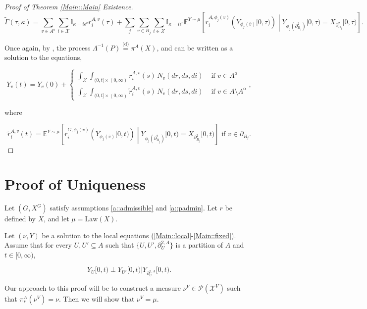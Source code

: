 \documentclass[12pt]{article}
\newcommand{\mb}{\mathbb}
\newcommand{\mc}{\mathcal}
\newcommand{\ov}{\overline}
\newcommand{\te}{\text}
\newcommand{\ep}{\epsilon}
\newcommand{\ind}{\hspace{24pt}}
\newcommand{\exmu}[2]{\mb{E}^{#1}\left[#2\right]}	%
\newcommand{\deq}{\overset{\text{(d)}}{=}}			%
\newcommand{\pmsr}{\mc{P}}							%
\newcommand{\sta}{\mc{X}}							%
\newcommand{\neigh}[1]{\partial_{#1}}				%
\newcommand{\dneigh}[1]{\partial^2_{#1}}			%
\newcommand{\dgneigh}[2]{\partial^{2,#1}_{#2}}		%
\newcommand{\cl}[1]{\ov{#1}}						%
\newcommand{\Xf}{X}									%
\newcommand{\poiss}{N}								%
\newcommand{\rate}{r}								%
\newcommand{\m}{\mu}								%
\newcommand{\proj}{\pi}								%
\newcommand{\poissv}[1]{_{#1}}						%
\newcommand{\vind}[1]{_{#1}}						%
\newcommand{\tme}[1]{(#1)}							%
\newcommand{\tmi}[1]{#1}							%
\newcommand{\gind}[1]{^{#1}}						%
\newcommand{\vpara}[1]{^{#1}}						%
\newcommand{\stpara}[1]{_{#1}}						%
\newcommand{\gvpara}[2]{^{#1,#2}}					%
\newcommand{\psf}{_*}								%
\newcommand{\Xg}{Y}									%
\newcommand{\brate}{\alt{\rate}}					%
\newcommand{\inte}[1]{{#1}^\mathrm{o}}				%
\newcommand{\alt}[1]{\tilde{#1}}					%
\newcommand{\pmap}{\Lambda}							%
\newcommand{\rt}{\tau}								%
\renewcommand{\mark}{\kappa}						%
\newcommand{\ratee}{\Gamma}							%
\newcommand{\rp}{P}									%
\newcommand{\mm}{\nu}								%
\newcommand{\law}{\te{Law}}							%
\newcommand{\ev}[1]{\ep^{#1}}						%
\begin{document}
\begin{proof}[Proof of Theorem \ref{Main::Main} Existence]
\[\alt{\ratee}(\rt,\mark) = \sum_{v \in \inte{A}}\sum_{i\in \sta} \mb{I}_{\mark = i\ev{v}}\rate\gvpara{A}{v}\stpara{i}\tme{\rt} + \sum_j\sum_{v \in B_j}\sum_{i \in \sta} \mb{I}_{\mark = i\ev{v}}\exmu{\Xg\sim \m}{\rate\gvpara{A}{\phi_j(v)}\stpara{i}\left(\Xg\vind{\phi_j(\cl{v})}\tmi{[0,\rt)}\right)\middle|\Xg\vind{\phi_j(\dneigh{B_j})}\tmi{[0,\rt)} = \Xf\vind{\dneigh{B_j}}\tmi{[0,\rt)}}.\]

Once again, by \cite[Exercise 14.7.1]{DalVer08}, the process \(\pmap^{-1}(\rp) \deq \proj\vpara{A}(\Xf)\), and can be written as a solution to the equations,

\[\Xg\vind{v}\tme{t} = \Xg\vind{v}\tme{0} + \begin{cases}
\int_\sta\int_{(0,t]\times (0,\infty)} \rate\gvpara{A}{v}\stpara{i}\tme{s}\,\poiss\poissv{v}(dr,ds,di) &\te{ if } v \in \inte{A}\\
\int_\sta\int_{(0,t]\times (0,\infty)} \brate\gvpara{A}{v}\stpara{i}\tme{s}\,\poiss\poissv{v}(dr,ds,di) &\te{ if } v \in A\setminus\inte{A}
\end{cases},\]

where

\[\brate\gvpara{A}{v}\stpara{i}\tme{t} = \exmu{\Xg\sim \m}{\rate\gvpara{G}{\phi_j(v)}\stpara{i}\left(\Xg\vind{\phi_j(\cl{v})}\tmi{[0,t)}\right)\middle|\Xg\vind{\phi_j(\dneigh{B_j})}\tmi{[0,t)} = \Xf\vind{\dneigh{B_j}}\tmi{[0,t)}}\te{ if } v \in \neigh{B_j}.\]

\end{proof}

\section{Proof of Uniqueness}
\label{Uq}

Let \((G,\Xf\gind{G})\) satisfy assumptions \ref{a::admissible} and \ref{a::padmin}. Let \(\rate\) be defined by \(\Xf\), and let \(\m = \law(\Xf)\).

\ind Let \((\mm,\Xg)\) be a solution to the local equations (\eqref{Main::local}-\eqref{Main::fixed}). Assume that for every \(U,U' \subseteq A\) such that \(\{U,U',\dgneigh{A}{U}\}\) is a partition of \(A\) and \(t \in [0,\infty)\),

\[\Xg\vind{U}\tmi{[0,t)} \perp \Xg\vind{U'}\tmi{[0,t)} |\Xg\vind{\dgneigh{A}{U}}\tmi{[0,t)}.\]

Our approach to this proof will be to construct a measure \(\mm\vpara{V} \in \pmsr(\sta^V)\) such that \(\proj\psf\vpara{A}(\mm\vpara{V}) = \mm\). Then we will show that \(\mm\vpara{V} = \m\). 
\end{document}
